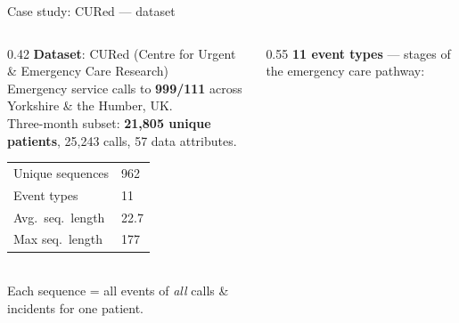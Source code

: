 \documentclass[aspectratio=169,t]{beamer}
\begin{document}
\begin{frame}[shrink=5]{Case study: CURed — dataset}
  \begin{columns}[T]
    \begin{column}{0.42\textwidth}
      \textbf{Dataset}: CURed (Centre for Urgent \& Emergency Care Research)\\[0.12cm]
      Emergency service calls to \textbf{999/111} across Yorkshire \& the Humber, UK.\\
      Three-month subset: \textbf{21,805 unique patients}, 25,243 calls, 57 data attributes.\\[0.18cm]
      \begin{tabular}{ll}
        \toprule
        Unique sequences   & 962  \\
        Event types        & 11   \\
        Avg.\ seq.\ length & 22.7 \\
        Max seq.\ length   & 177  \\
        \bottomrule
      \end{tabular}\\[0.18cm]
      Each sequence = all events of \emph{all} calls \& incidents for one patient.
    \end{column}
    \begin{column}{0.55\textwidth}
      \textbf{11 event types} — stages of the emergency care pathway:
      \vspace{0.15cm}
      \begin{center}
\end{center}
\end{column}
\end{columns}
\end{frame}
\end{document}
